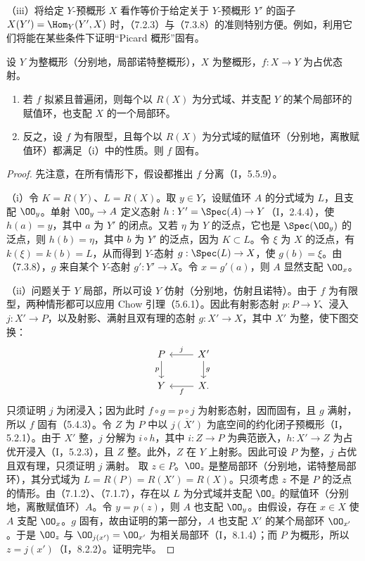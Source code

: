 （iii）将给定 $Y$-预概形 $X$ 看作等价于给定关于 $Y$-预概形 $Y'$ 的函子
$X(Y')=\Hom_Y(Y',X)$ 时，（7.2.3）与（7.3.8）的准则特别方便。例如，利用它们将能在某些条件下证明“Picard 概形”固有。

设 $Y$ 为整概形（分别地，局部诺特整概形），$X$ 为整概形，$f:X\to Y$ 为占优态射。
\begin{enumerate}[label=\textup{(\roman*)}]
\item 若 $f$ 拟紧且普遍闭，则每个以 $R(X)$ 为分式域、并支配 $Y$ 的某个局部环的赋值环，也支配 $X$ 的一个局部环。
\item 反之，设 $f$ 为有限型，且每个以 $R(X)$ 为分式域的赋值环（分别地，离散赋值环）都满足（i）中的性质。则 $f$ 固有。
\end{enumerate}
\begin{proof}
先注意，在所有情形下，假设都推出 $f$ 分离（I，5.5.9）。

（i）令 $K=R(Y)$、$L=R(X)$。取 $y\in Y$，设赋值环 $A$ 的分式域为 $L$，且支配 $\OO_y$。单射 $\OO_y\to A$ 定义态射 $h:Y'=\Spec(A)\to Y$（I，2.4.4），使 $h(a)=y$，其中 $a$ 为 $Y'$ 的闭点。又若 $\eta$ 为 $Y$ 的泛点，它也是 $\Spec(\OO_y)$ 的泛点，则 $h(b)=\eta$，其中 $b$ 为 $Y'$ 的泛点，因为 $K\subset L$。令 $\xi$ 为 $X$ 的泛点，有 $k(\xi)=k(b)=L$，从而得到 $Y$-态射 $g:\Spec(L)\to X$，使 $g(b)=\xi$。由（7.3.8），$g$ 来自某个 $Y$-态射 $g':Y'\to X$。令 $x=g'(a)$，则 $A$ 显然支配 $\OO_x$。

（ii）问题关于 $Y$ 局部，所以可设 $Y$ 仿射（分别地，仿射且诺特）。由于 $f$ 为有限型，两种情形都可以应用 Chow 引理（5.6.1）。因此有射影态射 $p:P\to Y$、浸入 $j:X'\to P$，以及射影、满射且双有理的态射 $g:X'\to X$，其中 $X'$ 为整，使下图交换：
\[
\begin{tikzcd}
P\arrow[d,"p"']&X'\arrow[l,"j"']\arrow[d,"g"]\\
Y&X.\arrow[l,"f"]
\end{tikzcd}
\]
只须证明 $j$ 为闭浸入；因为此时 $f\circ g=p\circ j$ 为射影态射，因而固有，且 $g$ 满射，所以 $f$ 固有（5.4.3）。令 $Z$ 为 $P$ 中以 $\overline{j(X')}$ 为底空间的约化闭子预概形（I，5.2.1）。由于 $X'$ 整，$j$ 分解为 $i\circ h$，其中 $i:Z\to P$ 为典范嵌入，$h:X'\to Z$ 为占优开浸入（I，5.2.3），且 $Z$ 整。此外，$Z$ 在 $Y$ 上射影。因此可设 $P$ 为整，$j$ 占优且双有理，只须证明 $j$ 满射。
取 $z\in P$。$\OO_z$ 是整局部环（分别地，诺特整局部环），其分式域为
$L=R(P)=R(X')=R(X)$。只须考虑 $z$ 不是 $P$ 的泛点的情形。由（7.1.2）、（7.1.7），存在以 $L$ 为分式域并支配 $\OO_z$ 的赋值环（分别地，离散赋值环）$A$。令 $y=p(z)$，则 $A$ 也支配 $\OO_y$。由假设，存在 $x\in X$ 使 $A$ 支配 $\OO_x$。$g$ 固有，故由证明的第一部分，$A$ 也支配 $X'$ 的某个局部环 $\OO_{x'}$。于是 $\OO_z$ 与 $\OO_{j(x')}=\OO_{x'}$ 为相关局部环（I，8.1.4）；而 $P$ 为概形，所以 $z=j(x')$（I，8.2.2）。证明完毕。
\end{proof}


